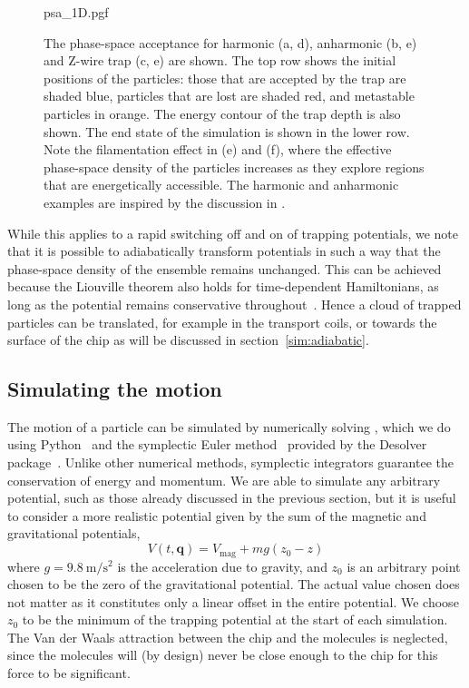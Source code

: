 \begin{figure}[htb]
  \centering
  {psa_1D.pgf}
  \caption{
    The phase-space acceptance for harmonic (a, d), anharmonic (b, e) and
    Z-wire trap (c, e) are shown. The top row shows the initial positions of
    the particles: those that are accepted by the trap are shaded blue,
    particles that are lost are shaded red, and metastable particles in orange.
    The energy contour of the trap depth is also shown. The end state of the
    simulation is shown in the lower row. Note the filamentation effect in (e)
    and (f), where the effective phase-space density of the particles increases
    as they explore regions that are energetically accessible. The harmonic and
    anharmonic examples are inspired by the discussion in
    .
  }
  \label{sim:fig:psaeg}
\end{figure}

While this applies to a rapid switching off and on of trapping potentials, we
note that it is possible to adiabatically transform potentials in such a way
that the phase-space density of the ensemble remains unchanged. This can be
achieved because the Liouville theorem also holds for time-dependent
Hamiltonians, as long as the potential remains conservative
throughout~\cite{Hand1998, Lichtenberg1969}. Hence a cloud of trapped particles
can be translated, for example in the transport coils, or towards the surface
of the chip as will be discussed in section~\ref{sim:adiabatic}.

\subsection{Simulating the motion}
\label{sim:motion:simmethods}

The motion of a particle can be simulated by numerically solving
, which we do using Python~\cite{python} and the
symplectic Euler method~\cite{Hairer2015, doi:10.1119/1.2034523} provided by
the Desolver package~\cite{desolver}. Unlike other numerical methods,
symplectic integrators guarantee the conservation of energy and momentum.
We are able to simulate any arbitrary potential, such as those already
discussed in the previous section, but it is useful to consider a more
realistic potential given by the sum of the magnetic and gravitational
potentials,
%
\begin{equation}
  V(t, \mathbf{q}) = V_\text{mag} + mg(z_0-z)
\end{equation}
where $g=\SI{9.8}{\meter\per\second\squared}$ is the acceleration due to
gravity, and $z_0$ is an arbitrary point chosen to be the zero of the
gravitational potential. The actual value chosen does not matter as it
constitutes only a linear offset in the entire potential. We choose
$z_0$ to be the minimum of the trapping potential at the start of each
simulation.
%
The Van der Waals attraction between the chip and the molecules is neglected,
since the molecules will (by design) never be close enough to the chip for this
force to be significant.

